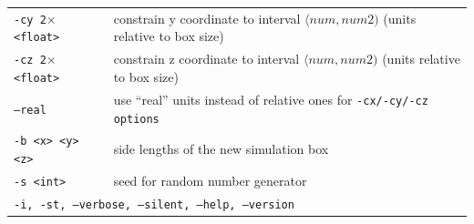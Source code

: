 \begin{longtable}{p{}p{}}
  \tt{-cy 2$\times$<float>}& constrain y coordinate to interval
                             $\langle num, num2)$ (units relative to box size)\\
  \tt{-cz 2$\times$<float>}& constrain z coordinate to interval
                             $\langle num, num2)$ (units relative to box size)\\
  \tt{--real}              & use \enquote{real} units instead of relative ones
                             for \tt{-cx}/\tt{-cy}/\tt{-cz} options\\
  \tt{-b <x> <y> <z>}      & side lengths of the new simulation box\\
  \tt{-s <int>}            & seed for random number generator\\
  \midrule
  \multicolumn{2}{p{0.948\textwidth}}{\tt{-i},
                                      \tt{-st},
                                      \tt{--verbose},
                                      \tt{--silent},
                                      \tt{--help},
                                      \tt{--version}}\\
  \bottomrule
\end{longtable}
